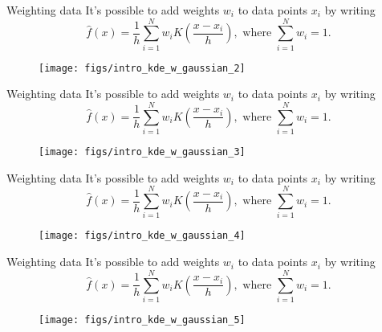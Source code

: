 \documentclass[11pt, aspectratio=149]{beamer}
\theoremstyle{plain}
\begin{document}
\begin{frame}[fragile, t]{Weighting data}
	It's possible to add weights $w_i$ to data points $x_i$ by writing
	\begin{equation*}
	\hat{f}(x) = \frac{1}{h} \sum_{i=1}^{N} w_i K\left(\frac{x - x_i}{h}\right), \text{ where } \sum_{i=1}^{N} w_i = 1.
	\end{equation*}
	\vfill
	\begin{figure}
		\centering
		\texttt{[image: figs/intro\_kde\_w\_gaussian\_2]}
	\end{figure}
\end{frame}


\begin{frame}[fragile, t]{Weighting data}
	It's possible to add weights $w_i$ to data points $x_i$ by writing
	\begin{equation*}
	\hat{f}(x) = \frac{1}{h} \sum_{i=1}^{N} w_i K\left(\frac{x - x_i}{h}\right), \text{ where } \sum_{i=1}^{N} w_i = 1.
	\end{equation*}
	\vfill
	\begin{figure}
		\centering
		\texttt{[image: figs/intro\_kde\_w\_gaussian\_3]}
	\end{figure}
\end{frame}


\begin{frame}[fragile, t]{Weighting data}
	It's possible to add weights $w_i$ to data points $x_i$ by writing
	\begin{equation*}
	\hat{f}(x) = \frac{1}{h} \sum_{i=1}^{N} w_i K\left(\frac{x - x_i}{h}\right), \text{ where } \sum_{i=1}^{N} w_i = 1.
	\end{equation*}
	\vfill
	\begin{figure}
		\centering
		\texttt{[image: figs/intro\_kde\_w\_gaussian\_4]}
	\end{figure}
\end{frame}


\begin{frame}[fragile, t]{Weighting data}
	It's possible to add weights $w_i$ to data points $x_i$ by writing
	\begin{equation*}
	\hat{f}(x) = \frac{1}{h} \sum_{i=1}^{N} w_i K\left(\frac{x - x_i}{h}\right), \text{ where } \sum_{i=1}^{N} w_i = 1.
	\end{equation*}
	\vfill
	\begin{figure}
		\centering
		\texttt{[image: figs/intro\_kde\_w\_gaussian\_5]}
	\end{figure}
\end{frame}
\end{document}
